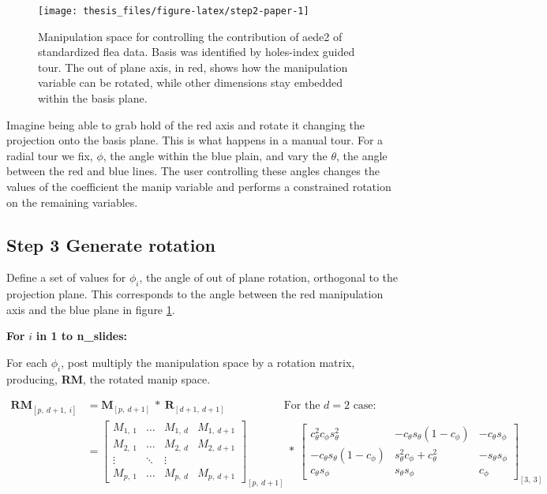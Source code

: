 \documentclass{monashthesis}
\begin{document}
\begin{figure}

{\centering \texttt{[image: thesis\_files/figure-latex/step2-paper-1]} 

}

\caption{Manipulation space for controlling the contribution of aede2 of standardized flea data. Basis was identified by holes-index guided tour. The out of plane axis, in red, shows how the manipulation variable can be rotated, while other dimensions stay embedded within the basis plane.}\label{fig:step2-paper}
\end{figure}

Imagine being able to grab hold of the red axis and rotate it changing
the projection onto the basis plane. This is what happens in a manual
tour. For a radial tour we fix, \(\phi\), the angle within the blue
plain, and vary the \(\theta\), the angle between the red and blue
lines. The user controlling these angles changes the values of the
coefficient the manip variable and performs a constrained rotation on
the remaining variables.

\subsection{Step 3 Generate rotation}\label{step-3-generate-rotation-1}

Define a set of values for \(\phi_i\), the angle of out of plane
rotation, orthogonal to the projection plane. This corresponds to the
angle between the red manipulation axis and the blue plane in figure
\ref{fig:step2-paper}.

\textbf{For } \(i\) \textbf{in 1 to n\_slides:}

For each \(\phi_i\), post multiply the manipulation space by a rotation
matrix, producing, \textbf{RM}, the rotated manip space.

\begin{align*}
  \textbf{RM}_{[p,~d+1,~i]}
  &= \textbf{M}_{[p,~d+1]} ~*~ \textbf{R}_{[d+1,~d+1]}
    ~~~~~~~~~~~~~~~~~~~~~~~~\text{For the $d=2$ case:} \\
  &= \begin{bmatrix}
    M_{1,~1} & \dots & M_{1,~d} & M_{1,~d+1} \\
    M_{2,~1} & \dots & M_{2,~d} & M_{2,~d+1} \\
    \vdots   & \ddots& \vdots   \\
    M_{p,~1} & \dots & M_{p,~d} & M_{p,~d+1}
  \end{bmatrix}_{[p,~d+1]}
    ~*~
  \begin{bmatrix}
    c_\theta^2 c_\phi s_\theta^2 &
    -c_\theta s_\theta (1 - c_\phi) &
    -c_\theta s_\phi \\
    -c_\theta s_\theta (1 - c_\phi) &
    s_\theta^2 c_\phi + c_\theta^2 &
    -s_\theta s_\phi \\
    c_\theta s_\phi &
    s_\theta s_\phi &
    c_\phi
  \end{bmatrix}_{[3,~3]}
\end{align*}
\end{document}
